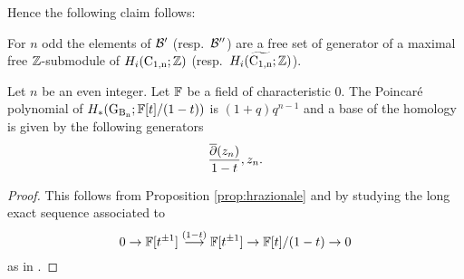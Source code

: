 Hence the following claim follows:
\begin{prop}\label{prop:BB}
For $n$ odd the elements of $\mathcal{B}'$ (resp.~$\mathcal{B}''$) are a free set of generator of a maximal free $\mathbb{Z}$-submodule of $H_i(\operatorname{C_{1,n}};\mathbb{Z})$ (resp.~$H_i(\widetilde{\operatorname{C_{1,n}}};\mathbb{Z})$).
\end{prop}

\begin{prop}\label{prop:hrazionale_minus_t}
Let $n$ be an even integer. Let $\mathbb{F}$ be a field of characteristic $0$.
The Poincar\'e polynomial of 
$H_*(\operatorname{G_{B_{n}}}; \mathbb{F}[t]/(1-t))$ is $(1+q)q^{n-1}
$
and a base of the homology is given by the following generators
$$\frac{\overline{\partial} (z_{n})}{1-t},  z_{n}.$$
\end{prop}	
\begin{proof}
This follows from Proposition \ref{prop:hrazionale} and by studying the long exact sequence associated to $$
0 \to \mathbb{F}[t^{\pm 1}] \stackrel{(1-t)}{\longrightarrow} \mathbb{F}[t^{\pm 1}] \to \mathbb{F}[t]/(1-t) \to 0
$$ as in \cite[\S~4.2]{calmar}.
\end{proof}
